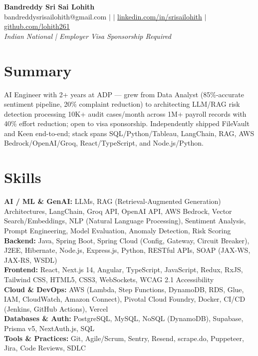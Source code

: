 \documentclass[10pt,letterpaper]{article}
\newcommand{\skillrow}[2]{\textbf{#1:} #2 \\[1pt]}
\begin{document}
\begin{center}
  {\Huge\bfseries Bandreddy Sri Sai Lohith}\\[3pt]
  \small bandreddysrisailohith@gmail.com $\vert$ $\vert$\; \href{https://linkedin.com/in/srisailohith}{linkedin.com/in/srisailohith} $\vert$\; \href{https://github.com/lohith261}{github.com/lohith261} \\[2pt]
  \small\textit{Indian National | Employer Visa Sponsorship Required}
\end{center}

\section{Summary}

AI Engineer with 2+ years at ADP --- grew from Data Analyst (85\%-accurate sentiment pipeline, 20\% complaint reduction) to architecting LLM/RAG risk detection processing 10K+ audit cases/month across 1M+ payroll records with 40\% effort reduction; open to visa sponsorship.
      Independently shipped FileVault and Keen end-to-end; stack spans SQL/Python/Tableau, LangChain, RAG, AWS Bedrock/OpenAI/Groq, React/TypeScript, and Node.js/Python.

\section{Skills}

\skillrow{AI / ML \& GenAI}{LLMs, RAG (Retrieval-Augmented Generation) Architectures, LangChain, Groq API, OpenAI API, AWS Bedrock, Vector Search/Embeddings, NLP (Natural Language Processing), Sentiment Analysis, Prompt Engineering, Model Evaluation, Anomaly Detection, Risk Scoring}
\skillrow{Backend}{Java, Spring Boot, Spring Cloud (Config, Gateway, Circuit Breaker), J2EE, Hibernate, Node.js, Express.js, Python, RESTful APIs, SOAP (JAX-WS, JAX-RS, WSDL)}
\skillrow{Frontend}{React, Next.js 14, Angular, TypeScript, JavaScript, Redux, RxJS, Tailwind CSS, HTML5, CSS3, WebSockets, WCAG 2.1 Accessibility}
\skillrow{Cloud \& DevOps}{AWS (Lambda, Step Functions, DynamoDB, RDS, Glue, IAM, CloudWatch, Amazon Connect), Pivotal Cloud Foundry, Docker, CI/CD (Jenkins, GitHub Actions), Vercel}
\skillrow{Databases \& Auth}{PostgreSQL, MySQL, NoSQL (DynamoDB), Supabase, Prisma v5, NextAuth.js, SQL}
\skillrow{Tools \& Practices}{Git, Agile/Scrum, Sentry, Resend, scrape.do, Puppeteer, Jira, Code Reviews, SDLC}
\end{document}
